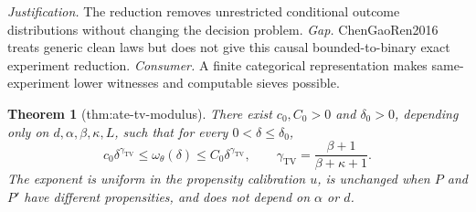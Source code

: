 \documentclass{article}
\newtheorem{theorem}{Theorem}
\begin{document}
\par\smallskip\noindent \textit{Justification.} The reduction removes unrestricted conditional outcome distributions without changing the decision problem. \textit{Gap.} ChenGaoRen2016 treats generic clean laws but does not give this causal bounded-to-binary exact experiment reduction. \textit{Consumer.} A finite categorical representation makes same-experiment lower witnesses and computable sieves possible.

\begin{theorem}[thm:ate-tv-modulus]\label{thm:ate-tv-modulus}
There exist \(c_0,C_0>0\) and \(\delta_0>0\), depending only on \(d,\alpha,\beta,\kappa,L\), such that for every \(0<\delta\leq\delta_0\), \[c_0\delta^{\gamma_{\mathrm{TV}}}\leq\omega_\theta(\delta)\leq C_0\delta^{\gamma_{\mathrm{TV}}},\qquad \gamma_{\mathrm{TV}}=\frac{\beta+1}{\beta+\kappa+1}.\] The exponent is uniform in the propensity calibration \(u\), is unchanged when \(P\) and \(P'\) have different propensities, and does not depend on \(\alpha\) or \(d\).
\end{theorem}
\end{document}
